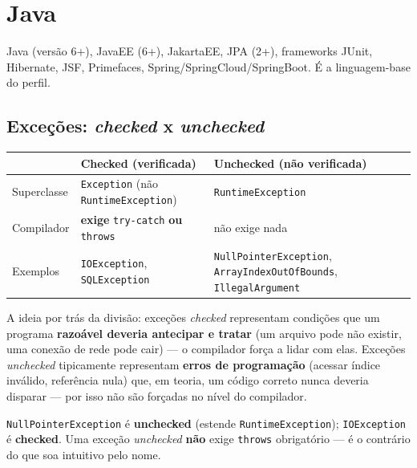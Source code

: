 \chapter{Java}
\label{cap:java-teoria}

\begin{edital}
Java (versão 6+), JavaEE (6+), JakartaEE, JPA (2+), frameworks JUnit,
Hibernate, JSF, Primefaces, Spring/SpringCloud/SpringBoot. É a
linguagem-base do perfil.
\end{edital}

\section{Exceções: \textit{checked} x \textit{unchecked}}

\begin{conceito}
\begin{center}
\begin{tabular}{@{}p{2.6cm}p{4.6cm}p{4.6cm}@{}}
\toprule
& \textbf{Checked (verificada)} & \textbf{Unchecked (não verificada)} \\
\midrule
Superclasse & \texttt{Exception} (não \texttt{RuntimeException}) &
\texttt{RuntimeException} \\
Compilador & \textbf{exige} \texttt{try-catch} \textbf{ou}
\texttt{throws} & não exige nada \\
Exemplos & \texttt{IOException}, \texttt{SQLException} &
\texttt{NullPointerException}, \texttt{ArrayIndexOutOfBounds},
\texttt{IllegalArgument} \\
\bottomrule
\end{tabular}
\end{center}
A ideia por trás da divisão: exceções \textit{checked} representam
condições que um programa \textbf{razoável deveria antecipar e tratar}
(um arquivo pode não existir, uma conexão de rede pode cair) --- o
compilador força a lidar com elas. Exceções \textit{unchecked} tipicamente
representam \textbf{erros de programação} (acessar índice inválido,
referência nula) que, em teoria, um código correto nunca deveria disparar
--- por isso não são forçadas no nível do compilador.
\end{conceito}

\begin{cuidado}
\texttt{NullPointerException} é \textbf{unchecked} (estende
\texttt{RuntimeException}); \texttt{IOException} é \textbf{checked}. Uma
exceção \textit{unchecked} \textbf{não} exige \texttt{throws} obrigatório
--- é o contrário do que soa intuitivo pelo nome.
\end{cuidado}

